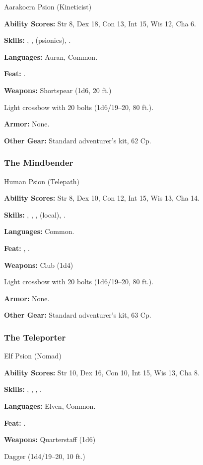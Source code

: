 Aarakocra Psion (Kineticist)

\textbf{Ability Scores:} Str 8, Dex 18, Con 13, Int 15, Wis 12, Cha 6.

\textbf{Skills:} , ,  (psionics), .

\textbf{Languages:} Auran, Common.

\textbf{Feat:} .

\textbf{Weapons:} Shortspear (1d6, 20 ft.)

Light crossbow with 20 bolts (1d6/19--20, 80 ft.).

\textbf{Armor:} None.

\textbf{Other Gear:} Standard adventurer's kit, 62 Cp.

\subsubsection{The Mindbender}
Human Psion (Telepath)

\textbf{Ability Scores:} Str 8, Dex 10, Con 12, Int 15, Wis 13, Cha 14.

\textbf{Skills:} , , ,  (local), .

\textbf{Languages:} Common.

\textbf{Feat:} , .

\textbf{Weapons:} Club (1d4)

Light crossbow with 20 bolts (1d6/19--20, 80 ft.).

\textbf{Armor:} None.

\textbf{Other Gear:} Standard adventurer's kit, 63 Cp.

\subsubsection{The Teleporter}
Elf Psion (Nomad)

\textbf{Ability Scores:} Str 10, Dex 16, Con 10, Int 15, Wis 13, Cha 8.

\textbf{Skills:} , , , .

\textbf{Languages:} Elven, Common.

\textbf{Feat:} .

\textbf{Weapons:} Quarterstaff (1d6)

Dagger (1d4/19--20, 10 ft.)

